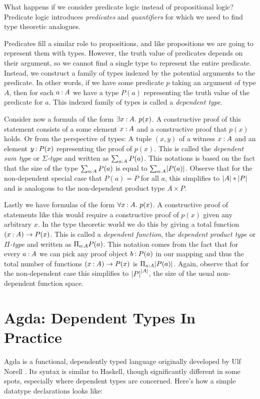 What happens if we consider predicate logic instead of propositional logic? Predicate logic introduces \emph{predicates} and \emph{quantifiers} for which we need to find type theoretic analogues.

Predicates fill a similar role to propositions, and like propositions we are going to represent them with types. However, the truth value of predicates depends on their argument, so we cannot find a single type to represent the entire predicate. Instead, we construct a family of types indexed by the potential arguments to the predicate. In other words, if we have some predicate $p$ taking an argument of type $A$, then for each $a \mathbin{:} A$ we have a type $P(a)$ representing the truth value of the predicate for $a$. This indexed family of types is called a \emph{dependent type}.

Consider now a formula of the form $\exists x \mathbin{:} A.~p(x)$. A constructive proof of this statement consists of a some element $x \mathbin{:} A$ and a constructive proof that $p(x)$ holds. Or from the perspective of types: A tuple $(x , y)$ of a witness $x \mathbin{:} A$ and an element $y \mathbin{:} P(x)$ representing the proof of $p(x)$. This is called the \emph{dependent sum type} or $\Sigma$\emph{-type} and written as $\sum_{a \mathbin{:} A}P(a)$. This notations is based on the fact that the size of the type $\sum_{a \mathbin{:} A}P(a)$ is equal to $\sum_{a \mathbin{:} A} \lvert P(a)\rvert$. Observe that for the non-dependent special case that $P(a) = P$ for all $a$, this simplifies to $\lvert A\rvert * \lvert P\rvert$ and is analogous to the non-dependent product type $A \times P$.

Lastly we have formulas of the form $\forall x \mathbin{:} A.~p(x)$. A constructive proof of statements like this would require a constructive proof of $p(x)$ given any arbitrary $x$. In the type theoretic world we do this by giving a total function $(x \mathbin{:} A) \to P(x)$. This is called a \emph{dependent function}, the \emph{dependent product type} or $\Pi$\emph{-type} and written as $\Pi_{a \mathbin{:} A} P(a)$. This notation comes from the fact that for every $a \mathbin{:} A$ we can pick any proof object $b \mathbin{:} P(a)$ in our mapping and thus the total number of functions $(x \mathbin{:} A) \to P(x)$ is $\Pi_{a \mathbin{:} A} \lvert P(a)\rvert$. Again, observe that for the non-dependent case this simplifies to ${\lvert P\rvert}^{\lvert A\rvert}$, the size of the usual non-dependent function space.

\section{Agda: Dependent Types In Practice}
Agda is a functional, dependently typed language originally developed by Ulf Norell \cite{norell:thesis}. Its syntax is similar to Haskell, though significantly different in some spots, especially where dependent types are concerned. Here's how a simple datatype declarations looks like:

